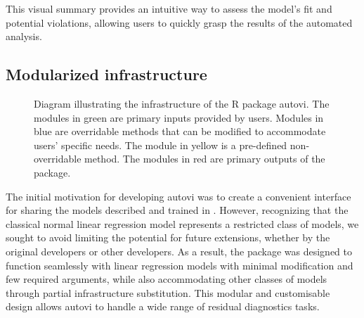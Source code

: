 \documentclass[
doublespace,
  times]{anzsauth}
\begin{document}
This visual summary provides an intuitive way to assess the model's fit
and potential violations, allowing users to quickly grasp the results of
the automated analysis.

\subsection{Modularized infrastructure}\label{sec-autovi-infrastructure}

\begin{figure}


\caption{\label{fig-autovi-diag}Diagram illustrating the infrastructure
of the \textsf{R} package \textsf{autovi}. The modules in green are
primary inputs provided by users. Modules in blue are overridable
methods that can be modified to accommodate users' specific needs. The
module in yellow is a pre-defined non-overridable method. The modules in
red are primary outputs of the package.}

\end{figure}%

The initial motivation for developing \textsf{autovi} was to create a
convenient interface for sharing the models described and trained in
\citet{li2024automated}. However, recognizing that the classical normal
linear regression model represents a restricted class of models, we
sought to avoid limiting the potential for future extensions, whether by
the original developers or other developers. As a result, the package
was designed to function seamlessly with linear regression models with
minimal modification and few required arguments, while also
accommodating other classes of models through partial infrastructure
substitution. This modular and customisable design allows
\textsf{autovi} to handle a wide range of residual diagnostics tasks.
\end{document}
